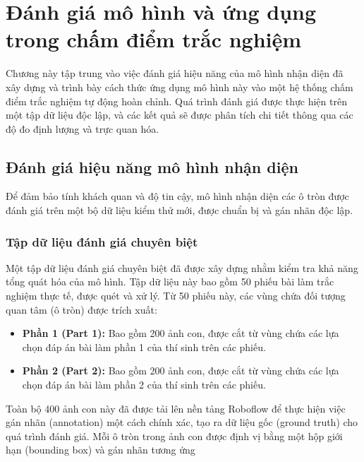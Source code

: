 \chapter{Đánh giá mô hình và ứng dụng trong chấm điểm trắc nghiệm}
\label{chap:danh_gia_ung_dung}

Chương này tập trung vào việc đánh giá hiệu năng của mô hình nhận diện đã xây dựng và trình bày cách thức ứng dụng mô hình này vào một hệ thống chấm điểm trắc nghiệm tự động hoàn chỉnh. Quá trình đánh giá được thực hiện trên một tập dữ liệu độc lập, và các kết quả sẽ được phân tích chi tiết thông qua các độ đo định lượng và trực quan hóa.

\section{Đánh giá hiệu năng mô hình nhận diện}
\label{sec:danh_gia_mo_hinh}
Để đảm bảo tính khách quan và độ tin cậy, mô hình nhận diện các ô tròn được đánh giá trên một bộ dữ liệu kiểm thử mới, được chuẩn bị và gán nhãn độc lập.

\subsection{Tập dữ liệu đánh giá chuyên biệt}
\label{ssec:bo_du_lieu_danh_gia}
Một tập dữ liệu đánh giá chuyên biệt đã được xây dựng nhằm kiểm tra khả năng tổng quát hóa của mô hình. Tập dữ liệu này bao gồm 50 phiếu bài làm trắc nghiệm thực tế, được quét và xử lý. Từ 50 phiếu này, các vùng chứa đối tượng quan tâm (ô tròn) được trích xuất:
\begin{itemize}
    \item \textbf{Phần 1 (Part 1):} Bao gồm 200 ảnh con, được cắt từ vùng chứa các lựa chọn đáp án bài làm phần 1 của thí sinh trên các phiếu.
    \item \textbf{Phần 2 (Part 2):} Bao gồm 200 ảnh con, được cắt từ vùng chứa các lựa chọn đáp án bài làm phần 2 của thí sinh trên các phiếu.
\end{itemize}
Toàn bộ 400 ảnh con này đã được tải lên nền tảng Roboflow để thực hiện việc gán nhãn (annotation) một cách chính xác, tạo ra dữ liệu gốc (ground truth) cho quá trình đánh giá. Mỗi ô tròn trong ảnh con được định vị bằng một hộp giới hạn (bounding box) và gán nhãn tương ứng 

